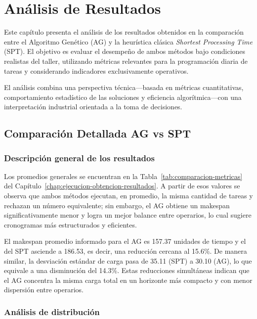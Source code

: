 \chapter{Análisis de Resultados}
\label{chap:analisis-resultados}

Este capítulo presenta el análisis de los resultados obtenidos en la comparación entre el Algoritmo Genético (AG) y la heurística clásica \textit{Shortest Processing Time} (SPT). El objetivo es evaluar el desempeño de ambos métodos bajo condiciones realistas del taller, utilizando métricas relevantes para la programación diaria de tareas y considerando indicadores exclusivamente operativos.

El análisis combina una perspectiva técnica—basada en métricas cuantitativas, comportamiento estadístico de las soluciones y eficiencia algorítmica—con una interpretación industrial orientada a la toma de decisiones.

\section{Comparación Detallada AG vs SPT}
\subsection{Descripción general de los resultados}

Los promedios generales se encuentran en la Tabla~\ref{tab:comparacion-metricas} del Capítulo~\ref{chap:ejecucion-obtencion-resultados}. A partir de esos valores se observa que ambos métodos ejecutan, en promedio, la misma cantidad de tareas y rechazan un número equivalente; sin embargo, el AG obtiene un makespan significativamente menor y logra un mejor balance entre operarios, lo cual sugiere cronogramas más estructurados y eficientes.

El makespan promedio informado para el AG es 157.37 unidades de tiempo y el del SPT asciende a 186.53, es decir, una reducción cercana al 15.6\%. De manera similar, la desviación estándar de carga pasa de 35.11 (SPT) a 30.10 (AG), lo que equivale a una disminución del 14.3\%. Estas reducciones simultáneas indican que el AG concentra la misma carga total en un horizonte más compacto y con menor dispersión entre operarios.

\subsection{Análisis de distribución}

